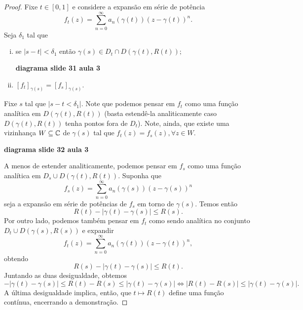 \begin{proof}
        Fixe $t\in [0,1]$ e considere a expansão em série de potência
        \begin{equation*}
            f_t(z) = \sum_{n=0}^{\infty} a_n(\gamma(t))(z-\gamma(t))^n.
        \end{equation*}
        Seja $\delta_1$ tal que 
        \begin{enumerate}[i)]
            \item se $|s-t|<\delta_1$ então $\gamma(s)\in D_t\cap D(\gamma(t), R(t));$
            \begin{center}
                \textbf{diagrama slide 31 aula 3}
            \end{center}
            \item $[f_t]_{\gamma(s)} = [f_s]_{\gamma(s)}$.
        \end{enumerate}
        Fixe $s$ tal que $|s-t<\delta_1|$. Note que podemos pensar em $f_t$ como uma 
        função analítica em $D(\gamma(t), R(t))$ (basta estendê-la analiticamente caso
        $D(\gamma(t), R(t))$ tenha pontos fora de $D_t$). Note, ainda, que existe uma 
        vizinhança $W\subseteq\mathbb{C}$ de $\gamma(s)$ tal que 
        $f_t(z) = f_s(z), \forall z\in W$.
        \begin{center}
            \textbf{diagrama slide 32 aula 3}
        \end{center}
        A menos de estender analiticamente, podemos pensar em $f_s$ como uma função analítica
        em $D_s\cup D(\gamma(t), R(t))$. Suponha que
        \begin{equation*}
            f_s(z) = \sum_{n=0}^\infty a_n(\gamma(s))(z-\gamma(s))^n
        \end{equation*}
        seja a expansão em série de potências de $f_s$ em torno de $\gamma(s)$. Temos então
        \begin{equation*}
            R(t) - |\gamma(t) - \gamma(s)| \leq R(s).
        \end{equation*}
        Por outro lado, podemos também pensar em $f_t$ como sendo analítica no conjunto
        $D_t\cup D(\gamma(s), R(s))$ e expandir
        \begin{equation*}
            f_t(z) = \sum_{n=0}^\infty a_n(\gamma(t))(z-\gamma(t))^n,
        \end{equation*}
        obtendo
        \begin{equation*}
            R(s) - |\gamma(t) - \gamma(s)| \leq R(t).
        \end{equation*}
        Juntando as duas desigualdade, obtemos
        \begin{equation*}
            -|\gamma(t) - \gamma(s)| \leq R(t) - R(s) \leq |\gamma(t) - \gamma(s)| 
            \iff
            |R(t) - R(s)| \leq |\gamma(t) - \gamma(s)|.
        \end{equation*}
        A última desigualdade implica, então, que $t\mapsto R(t)$ define uma função contínua,
        encerrando a demonstração.
    \end{proof}

